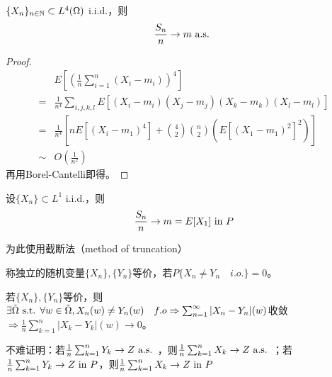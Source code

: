 \documentclass{ctexart}
\begin{document}
\begin{Eg}
  $\{X_{n}\}_{n\in\mathbb{N}}\subset L^{4}(\Omega)$ i.i.d.，则
  \[\frac{S_{n}}{n}\to m\text{ a.s. }\]
\end{Eg}

\begin{proof}
\begin{align*}
  &E[(\frac{1}{n}\sum_{i=1}^{n}(X_{i}-m_{i}))^{4}]\\
  =&\frac{1}{n^{4}}\sum_{i,j,k,l}E[(X_{i}-m_{i})(X_{j}-m_{j})(X_{k}-m_{k})(X_{l}-m_{l})]\\
  =&\frac{1}{n^{4}}[nE[(X_{i}-m_{1})^{4}]+\binom{4}{2}\binom{n}{2}(E[(X_{1}-m_{1})^{2}]^{2})]\\
  \sim& O(\frac{1}{n^{2}})
\end{align*}
  再用Borel-Cantelli即得。
\end{proof}

\begin{Thm}
  设$\{X_{n}\}\subset L^{1}$ i.i.d.，则
  \[\frac{S_{n}}{n}\to m=E[X_{1}]\text{ in } P\]
\end{Thm}
为此使用截断法（method of truncation）

\begin{Def}
  称独立的随机变量$\{X_{n}\},\{Y_{n}\}$等价，若$P\{X_{n}\neq Y_n\quad i.o.\}=0$。
\end{Def}
若$\{X_{n}\},\{Y_{n}\}$等价，则$\exists \tilde{\Omega}\text{ s.t. } \forall w\in \tilde\Omega, X_{n}(w)\neq Y_{n}(w) \quad f.o\Rightarrow \sum_{n=1}^{\infty}|X_{n}-Y_{n}|(w)$收敛$\Rightarrow \frac{1}{n}\sum_{k=1}^{n}|X_{k}-Y_{k}|(w)\to 0$。

不难证明：若$\frac{1}{n}\sum_{k=1}^{n}Y_{k}\to Z\text{ a.s. }$，则$\frac{1}{n}\sum_{k=1}^{n}X_{k}\to Z\text{ a.s. }$；若$\frac{1}{n}\sum_{k=1}^{n}Y_{k}\to Z\text{ in } P$，则$\frac{1}{n}\sum_{k=1}^{n}X_{k}\to Z\text{ in } P$
\end{document}
